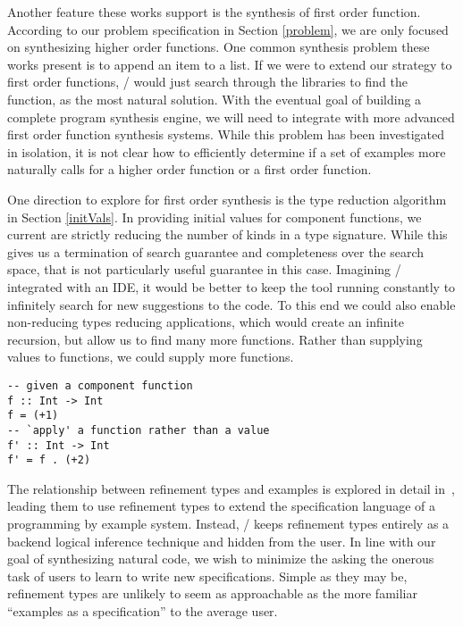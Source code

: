 Another feature these works support is the synthesis of first order function.
According to our problem specification in Section \ref{problem}, we are only focused on synthesizing higher order functions.
One common synthesis problem these works present is to append an item to a list.
If we were to extend our strategy to first order functions, \ourTool/ would just search through the libraries to find the  function, as the most natural solution.
With the eventual goal of building a complete program synthesis engine, we will need to integrate with more advanced first order function synthesis systems.
While this problem has been investigated in isolation, it is not clear how to efficiently determine if a set of examples more naturally calls for a higher order function or a first order function.

One direction to explore for first order synthesis is the type reduction algorithm in Section \ref{initVals}.
In providing initial values for component functions, we current are strictly reducing the number of kinds in a type signature.
While this gives us a termination of search guarantee and completeness over the search space, that is not particularly useful guarantee in this case.
Imagining \ourTool/ integrated with an IDE, it would be better to keep the tool running constantly to infinitely search for new suggestions to the code.
To this end we could also enable non-reducing types reducing applications, which would create an infinite recursion, but allow us to find many more functions.
Rather than supplying values to functions, we could supply more functions.

\begin{lstlisting}[numbers=none]
-- given a component function
f :: Int -> Int
f = (+1)
-- `apply' a function rather than a value
f' :: Int -> Int
f' = f . (+2)

\end{lstlisting}

The relationship between refinement types and examples is explored in detail in~\cite{Osera:2016}, leading them to use refinement types to extend the specification language of a programming by example system. Instead, \ourTool/ keeps refinement types entirely as a backend logical inference technique and hidden from the user. In line with our goal of synthesizing natural code, we wish to minimize the asking the onerous task of users to learn to write new specifications. Simple as they may be, refinement types are unlikely to seem as approachable as the more familiar ``examples as a specification'' to the average user.

